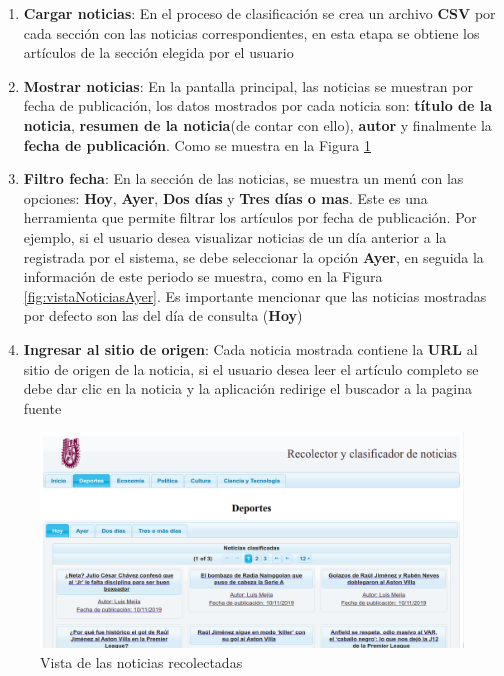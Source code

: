 \begin{enumerate}

	\item \textbf{Cargar noticias}: En el proceso de clasificación se crea un archivo \textbf{CSV} por cada sección con las noticias correspondientes, en esta etapa se obtiene los artículos de la sección elegida por el usuario

	\item \textbf{Mostrar noticias}: En la pantalla principal, las noticias se muestran por fecha de publicación, los datos mostrados por cada noticia son: \textbf{título de la noticia}, \textbf{resumen de la noticia}(de contar con ello), \textbf{autor} y finalmente la \textbf{fecha de publicación}. Como se muestra en la Figura \ref{fig:vistaNoticias}


	\item \textbf{Filtro fecha}: En la sección de las noticias, se muestra un menú con las opciones: \textbf{Hoy}, \textbf{Ayer}, \textbf{Dos días} y \textbf{Tres días o mas}. Este es una herramienta que permite filtrar los artículos por fecha de publicación. Por ejemplo, si el usuario desea visualizar noticias de un día anterior a la registrada por el sistema, se debe seleccionar la opción \textbf{Ayer}, en seguida la información de este periodo se muestra, como en la Figura \ref{fig:vistaNoticiasAyer}. Es importante mencionar que las noticias mostradas por defecto son las del día de consulta (\textbf{Hoy})

	\item \textbf{Ingresar al sitio de origen}: Cada noticia mostrada contiene la \textbf{URL} al sitio de origen de la noticia, si el usuario desea leer el artículo completo se debe dar clic en la noticia y la aplicación redirige el buscador a la pagina fuente

\end{enumerate}


\begin{figure}[H]
\centering
\includegraphics[scale=0.29]{imagenes/Capitulo5/noticiasDeHoy.png}
\caption{Vista de las noticias recolectadas}
\label{fig:vistaNoticias}
\end{figure}




